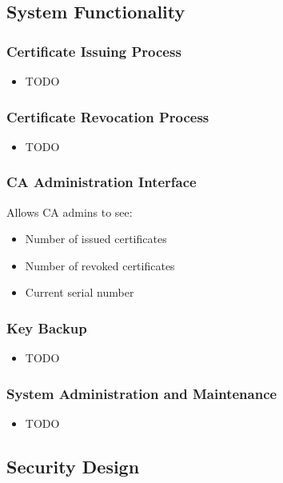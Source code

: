 \documentclass[english]{article}
\begin{document}
\subsection{System Functionality}


\subsubsection{Certificate Issuing Process}
\begin{itemize}
\item TODO
\end{itemize}

\subsubsection{Certificate Revocation Process}
\begin{itemize}
\item TODO
\end{itemize}

\subsubsection{CA Administration Interface}
Allows CA admins to see:
\begin{itemize}
\item Number of issued certificates
\item Number of revoked certificates
\item Current serial number
\end{itemize}

\subsubsection{Key Backup}
\begin{itemize}
\item TODO
\end{itemize}

\subsubsection{System Administration and Maintenance}
\begin{itemize}
\item TODO
\end{itemize}

\subsection{Security Design}
\end{document}
